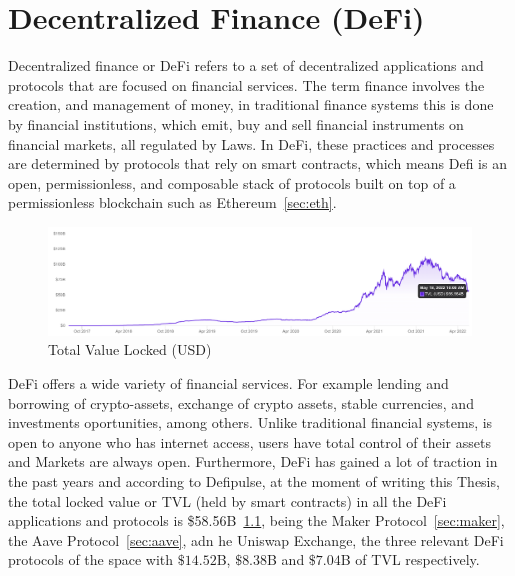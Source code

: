 \documentclass[11pt,a4paper]{report}
\begin{document}
\chapter{Decentralized Finance (DeFi)} \label{ch:defi}
Decentralized finance or DeFi\cite{article:cefidefi}\cite{article:defi} refers to a set of decentralized applications and protocols that are focused on financial services. The term finance\cite{wiki:Finance} involves the creation, and management of money, in traditional finance systems this is done by financial institutions\cite{wiki:Financial_institution}, which emit, buy and sell financial instruments\cite{wiki:Financial_instrument} on financial markets\cite{wiki:Financial_market}, all regulated by Laws. In DeFi,  these practices and processes are determined by protocols that rely on smart contracts, which means Defi is an open, permissionless, and composable stack of protocols built on top of a permissionless blockchain such as Ethereum~\ref{sec:eth}. 
\begin{figure}[htp]
	\centering
	\includegraphics[width=1\textwidth]{./images/tvl}
	\caption{Total Value Locked (USD)\cite{defipulse}}
	\label{fig:tvl}
\end{figure}

DeFi offers a wide variety of financial services. For example lending and borrowing of crypto-assets, exchange of crypto assets, stable currencies, and investments oportunities, among others. Unlike traditional financial systems, is open to anyone who has internet access, users have total control of their assets and Markets are always open. Furthermore, DeFi has gained a lot of traction in the past years and according to Defipulse\cite{defipulse}, at the moment of writing this Thesis, the total locked value or TVL (held by smart contracts) in all the DeFi applications and protocols is \$58.56B~\ref{fig:tvl}, being the Maker Protocol~\ref{sec:maker}, the Aave Protocol~\ref{sec:aave}, adn he Uniswap Exchange\cite{uniswap}, the three relevant DeFi protocols of the space with $\$14.52$B, $\$8.38$B and $\$7.04$B of TVL respectively. 
\end{document}
